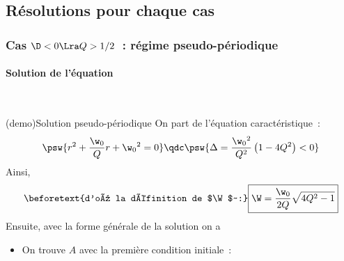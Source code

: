 \documentclass[../../main/main.tex]{subfiles}
\begin{document}
\subsection{Résolutions pour chaque cas}
\subsubsection{Cas $\D < 0 \Lra Q > 1/2$~: régime pseudo-périodique}
\paragraph{Solution de l'équation}
~ \smallbreak

\begin{tcb*}[label=demo:solupseudoper, breakable]
	(demo){Solution pseudo-périodique}
	On part de l'équation caractéristique~:
	\[
		\psw{%
			r^{2} + \frac{\w_0}{Q}r + \w_0{}^{2} = 0
		}%
		\qdc
		\psw{%
			\Delta = \frac{\w_0{}^{2}}{Q^{2}}\left( 1-4Q^{2} \right) < 0
		}%
	\]
	Ainsi,
	\vspace{-25pt}
	\vspace{-15pt}
	\begin{gather*}
		\beforetext{d'où la définition de $\W$~:}
		\boxed{\W = \frac{\w_0}{2Q}\sqrt{4Q^{2}-1}}
	\end{gather*}
	Ensuite, avec la forme générale de la solution on a
	\vspace{-15pt}
	\begin{itemize}
		\item On trouve $A$ avec la première condition initiale~:
\end{itemize}
\end{tcb*}
\end{document}
